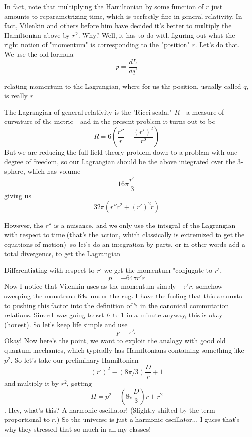 In fact, note that multiplying the Hamiltonian by some function of $r$ just amounts to reparametrizing time, which is perfectly fine in general relativity. In fact, Vilenkin and others before him have decided it's better to multiply the Hamiltonian above by $r^2$. Why? Well, it has to do with figuring out what the right notion of "momentum" is corresponding to the "position" $r$. Let's do that. We use the old formula
\[p = \frac{dL}{dq'}\]

relating momentum to the Lagrangian, where for us the position, usually called $q$, is really $r$.

The Lagrangian of general relativity is the "Ricci scalar" $R$ - a measure of curvature of the metric - and in the present problem it turns out to be
\[R = 6(\frac{r''}{r} + \frac{(r')^2}{r^2})\]
But we are reducing the full field theory problem down to a problem with one degree of freedom, so our Lagrangian should be the above integrated over the 3-sphere, which has volume \[16\pi\frac{r^3}{3}\] giving us \[32\pi (r''r^2 + (r')^2 r)\]

However, the $r''$ is a nuisance, and we only use the integral of the Lagrangian with respect to time (that's the action, which classically is extremized to get the equations of motion), so let's do an integration by parts, or in other words add a total divergence, to get the Lagrangian

Differentiating with respect to $r'$ we get the momentum "conjugate to $r$", \[p = -64\pi r'r\]
Now I notice that Vilenkin uses as the momentum simply $-r'r$, somehow sweeping the monstrous $64\pi$ under the rug. I have the feeling that this amounts to pushing this factor into the definition of ħ in the canonical commutation relations. Since I was going to set $\hbar$ to 1 in a minute anyway, this is okay (honest). So let's keep life simple and use
\[p = r'r\]
Okay! Now here's the point, we want to exploit the analogy with good old quantum mechanics, which typically has Hamiltonians containing something like $p^2$. So let's take our preliminary Hamiltonian
\[(r')^2 -(8\pi/3) \frac{D}{r} + 1\]
and multiply it by $r^2$, getting
\[H = p^2 - (8\pi \frac{D}{3})r + r^2\].
Hey, what's this? A harmonic oscillator! (Slightly shifted by the term proportional to $r$.) So the universe is just a harmonic oscillator... I guess that's why they stressed that so much in all my classes!

